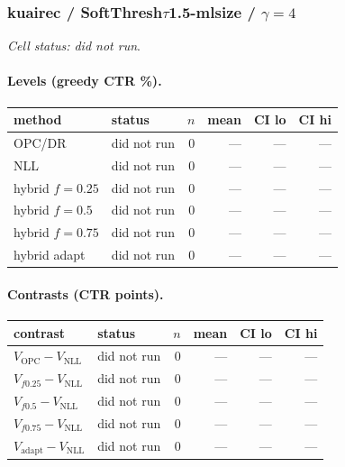 \documentclass[10pt,a4paper]{article}
\begin{document}
\subsubsection{kuairec / SoftThresh$\tau$1.5-mlsize / $\gamma=4$}
\emph{Cell status: did not run}.
\paragraph{Levels (greedy CTR \%).}
{\centering\small\begin{tabular}{llrrrr}
\toprule method & status & $n$ & mean & CI lo & CI hi \\
\midrule
OPC/DR & did not run & 0 & --- & --- & --- \\
NLL & did not run & 0 & --- & --- & --- \\
hybrid $f{=}0.25$ & did not run & 0 & --- & --- & --- \\
hybrid $f{=}0.5$ & did not run & 0 & --- & --- & --- \\
hybrid $f{=}0.75$ & did not run & 0 & --- & --- & --- \\
hybrid adapt & did not run & 0 & --- & --- & --- \\
\bottomrule\end{tabular}\par}
\paragraph{Contrasts (CTR points).}
{\centering\small\begin{tabular}{llrrrr}
\toprule contrast & status & $n$ & mean & CI lo & CI hi \\
\midrule
$V_{\mathrm{OPC}}-V_{\mathrm{NLL}}$ & did not run & 0 & --- & --- & --- \\
$V_{f0.25}-V_{\mathrm{NLL}}$ & did not run & 0 & --- & --- & --- \\
$V_{f0.5}-V_{\mathrm{NLL}}$ & did not run & 0 & --- & --- & --- \\
$V_{f0.75}-V_{\mathrm{NLL}}$ & did not run & 0 & --- & --- & --- \\
$V_{\mathrm{adapt}}-V_{\mathrm{NLL}}$ & did not run & 0 & --- & --- & --- \\
\bottomrule\end{tabular}\par}
\end{document}
